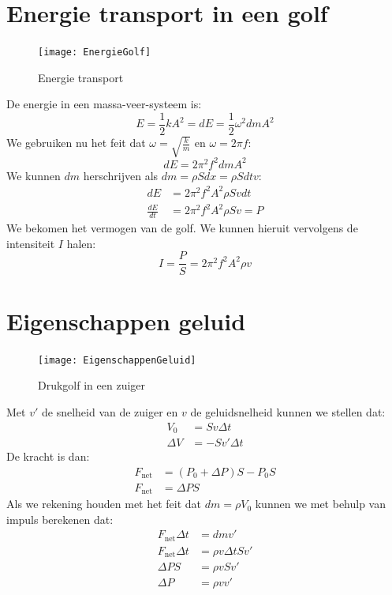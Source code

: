 \documentclass[a4paper,kul]{kulakarticle} %
\begin{document}
\section{Energie transport in een golf}
\begin{figure}[h]
	\centering
	\texttt{[image: EnergieGolf]}
	\caption[Energie transport]{Energie transport}
	\label{fig:energietransport}
\end{figure}
De energie in een massa-veer-systeem is:
\begin{equation*}
	E = \frac{1}{2}kA^2 = dE = \frac{1}{2}\omega^2dmA^2
\end{equation*}
We gebruiken nu het feit dat $\omega = \sqrt{\frac{k}{m}} $ en $\omega = 2\pi f$:
\begin{equation*}
	dE = 2\pi^2f^2dmA^2
\end{equation*}
We kunnen $dm$ herschrijven als $dm = \rho Sdx = \rho Sdtv$:
\begin{align*}
	dE &= 2\pi^2f^2A^2\rho Svdt\\
	\frac{dE}{dt} &= 2\pi^2f^2A^2\rho Sv = P
\end{align*}
We bekomen het vermogen van de golf. We kunnen hieruit vervolgens de intensiteit $I$ halen:
\begin{equation*}
	I = \frac{P}{S} = 2\pi^2f^2A^2\rho v
\end{equation*}
\newpage
\section{Eigenschappen geluid}
\begin{figure}[h]
	\centering
	\texttt{[image: EigenschappenGeluid]}
	\caption[Zuiger]{Drukgolf in een zuiger}
	\label{fig:drukgolfzuiger}
\end{figure}
Met $v'$ de snelheid van de zuiger en $v$ de geluidsnelheid kunnen we stellen dat:
\begin{align*}
	V_0 &=Sv\Delta t\\
	\Delta V &= -Sv'\Delta t
\end{align*}
De kracht is dan:
\begin{align*}
	F_{\text{net}} &= (P_0+\Delta P)S-P_0S\\
	F_{\text{net}}&= \Delta PS
\end{align*}
Als we rekening houden met het feit dat $dm=\rho V_0$ kunnen we met behulp van impuls berekenen dat:
\begin{align*}
	F_{\text{net}} \Delta t &=dmv'\\
	F_{\text{net}}\Delta t &= \rho v\Delta tSv'\\
	\Delta PS &= \rho vSv'\\
	\Delta P &= \rho vv'
\end{align*}
\newpage
\end{document}
